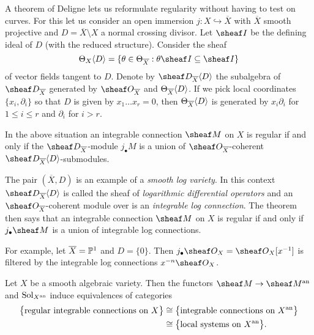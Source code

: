 \documentclass[number-in-sections,a4paper]{notes}
\begin{document}
A theorem of Deligne lets us reformulate regularity without having to test on curves.
For this let us consider an open immersion $j\colon X \hookrightarrow \overline X$ with $\overline X$ smooth projective and $D = \overline X \setminus X$ a normal crossing divisor.
Let $\sheaf I$ be the defining ideal of $D$ (with the reduced structure).
Consider the sheaf
\[
    \tb{X}\langle D \rangle  = \{ \theta \in \tb{\overline X} : \theta \sheaf I \subseteq \sheaf I \}
\]
of vector fields tangent to $D$.
Denote by $\sD_{\overline X}\langle D\rangle$ the subalgebra of $\sD_{\overline X}$ generated by $\sO_{\overline X}$ and $\Theta_{\overline X}\langle D\rangle$.
If we pick local coordinates $\{x_i, \partial_i\}$ so that $D$ is given by $x_1\dotsc x_r = 0$, then $\Theta_{\overline X}\langle D\rangle$ is generated by $x_i\partial_i$ for $1 \le i \le r$ and $\partial_i$ for $i > r$. 

\begin{Theorem}
    In the above situation an integrable connection $\sheaf M$ on $X$ is regular if and only if the $\sD_{\overline X}$-module $j_\bullet M$ is a union of $\sO_{\overline X}$-coherent $\sD_{\overline X}\langle D\rangle$-submodules.
\end{Theorem}

\begin{Remark}
    The pair $(\overline X, D)$ is an example of a \emph{smooth log variety}.
    In this context $\sD_{\overline X}\langle D\rangle$ is called the sheaf of \emph{logarithmic differential operators} and an $\sO_{\overline X}$-coherent module over is an \emph{integrable log connection}.
    The theorem then says that an integrable connection $\sheaf M$ on $X$ is regular if and only if $j_\bullet \sheaf M$ is a union of integrable log connections.

    For example, let $\overline X = \mathbb P^{1}_{}$ and $D = \{0\}$.
    Then $j_\bullet\sO_X = \sO_X[x^{-1}]$ is filtered by the integrable log connections $x^{-n}\sO_X$.
\end{Remark}

\begin{Theorem}
    Let $X$ be a smooth algebraic variety.
    Then the functors $\sheaf M \to \sheaf M^\an$ and $\operatorname{Sol}_{X^{\mathrm{an}}}$ induce equivalences of categories
    \begin{align*}
        \bigl\{ \textup{regular integrable connections on $X$}\bigr\}
        & \cong
        \bigl\{ \textup{integrable connections on $X^{\mathrm{an}}$}\bigr\}
        \\&\cong
        \bigl\{ \textup{local systems on $X^{\mathrm{an}}$} \bigr\}.
    \end{align*}
\end{Theorem}
\end{document}
